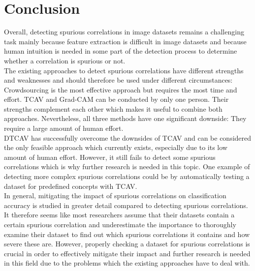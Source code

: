 \documentclass{article}
\begin{document}
\section{Conclusion}
Overall, detecting spurious correlations in image datasets remains a challenging task mainly because feature extraction is difficult in image datasets and
because human intuition is needed in some part of the detection process to determine whether a correlation is spurious or not. \\
The existing approaches to detect spurious correlations have different strengths and weaknesses and should therefore be used under different circumstances: 
Crowdsourcing is the most effective approach but requires the most time and effort. TCAV and Grad-CAM can be conducted by only one person. 
Their strengths complement each other which makes it useful to combine both approaches. Nevertheless, all three methods have one significant downside: 
They require a large amount of human effort. \\
DTCAV has successfully overcome the downsides of TCAV and can be considered the only feasible approach
which currently exists, especially due to its low amount of human effort. However, it still fails to detect some spurious correlations which is why further
research is needed in this topic. One example of detecting more complex spurious correlations could be by automatically testing a dataset for predefined
concepts with TCAV.\\
In general, mitigating the impact of spurious correlations on classification accuracy is studied in greater detail compared to detecting spurious
correlations. It therefore seems like most researchers assume that their datasets contain a certain spurious correlation and 
underestimate the importance to thoroughly examine their dataset to find out which spurious correlations it contains and how severe these are. 
However, properly checking a dataset for spurious correlations is crucial in order to effectively mitigate their impact and further research
is needed in this field due to the problems which the existing approaches have to deal with.

\printbibliography
\end{document}
